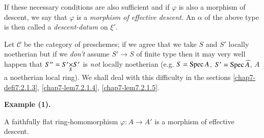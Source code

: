 If these necessary conditions are also sufficient and if $\varphi$ is
also a morphism of descent, we say that $\varphi$ is a {\em morphism
  of effective descent.} An $\alpha$ of the above type is then called
a {\em descent-datum} on $\xi'$.

\begin{remark*}
Let $\mathscr{C}$ be the category of preschemes; if we agree that we
take $S$ and $S'$ locally noetherian but if we {\em don't} assume
$S'\to S$ of finite type then it may very well happen that
$S''=\fprod{S'}{S'}{S}$ is {\em not} locally noetherian (e.g. $S=\operatorname{Spec}
A$, $S'=\operatorname{Spec} \widehat{A}$, $A$ a noetherian local ring). We shall
deal with this difficulty in the sections \ref{chap7-defi7.2.1.3},
\ref{chap7-lem7.2.1.4}, \ref{chap7-lem7.2.1.5}.
\end{remark*}

\medskip
\noindent
{\bf Example (1).}

\begin{prop}\label{chap7-prop7.1.1}
A faithfully flat ring-homomorphism $\varphi:A\to A'$ is a morphism of
effective descent.
\end{prop}

